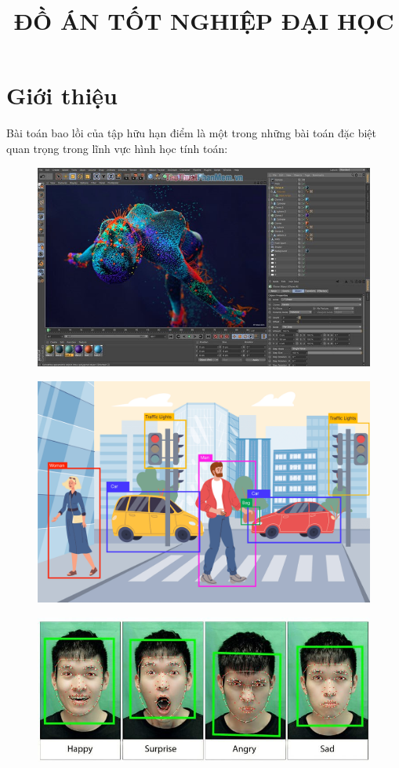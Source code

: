 \documentclass[11pt]{beamer}
\title[ \footnotesize  \textcolor{red}{\bf Đồ án tốt nghiệp} -- \textcolor{blue}{Trần Xuân Độ }]{\Large  \bf ĐỒ ÁN TỐT NGHIỆP ĐẠI HỌC}
\institute{\bf  Hà Nội, tháng 12 năm 2023}
\theoremstyle{definition}
\theoremstyle{plain}
\theoremstyle{plain}
\theoremstyle{remark}
\begin{document}
	\section{Giới thiệu}

	\begin{frame}
		Bài toán bao lồi của tập hữu hạn điểm là một trong những bài toán đặc biệt quan trọng trong lĩnh vực hình học tính toán:
		\begin{figure}
			\centering
			\includegraphics[width=0.7\linewidth]{do_hoa_may_tinh}
			\caption{}
			\label{fig:dohoamaytinh}
		\end{figure}
	\end{frame}
	\begin{frame}
		\begin{figure}
			\centering
			\includegraphics[width=0.7\linewidth]{nhan_dang_mau}
			\caption{}
			\label{fig:nhandangmau}
		\end{figure}
	\end{frame}
	\begin{frame}
		\begin{figure}
			\centering
			\includegraphics[width=0.7\linewidth]{xu_ly_hinh_anh}
			\caption{}
			\label{fig:xulyhinhanh}
		\end{figure}
		
	\end{frame}
\end{document}
